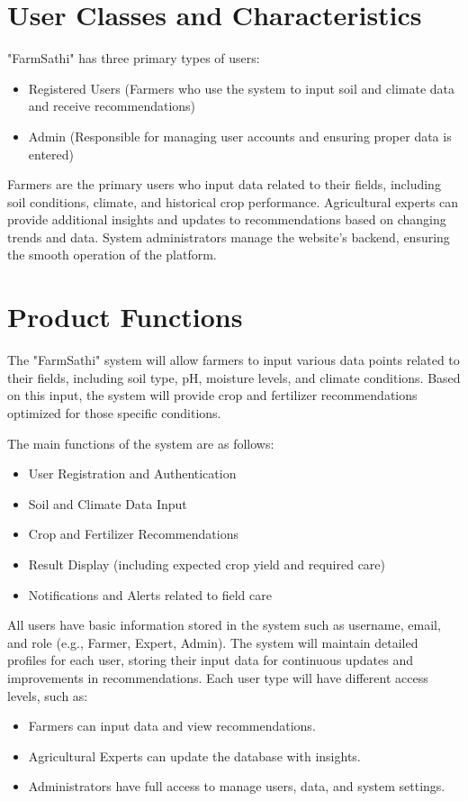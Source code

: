\documentclass{scrreprt}
\begin{document}
\section{User Classes and Characteristics}
"FarmSathi" has three primary types of users:
\begin{itemize}
    \item Registered Users (Farmers who use the system to input soil and climate data and receive recommendations)
    \item Admin (Responsible for managing user accounts and ensuring proper data is entered)
\end{itemize}
Farmers are the primary users who input data related to their fields, including soil conditions, climate, and historical crop performance. Agricultural experts can provide additional insights and updates to recommendations based on changing trends and data. System administrators manage the website's backend, ensuring the smooth operation of the platform.


\section{Product Functions}
The "FarmSathi" system will allow farmers to input various data points related to their fields, including soil type, pH, moisture levels, and climate conditions. Based on this input, the system will provide crop and fertilizer recommendations optimized for those specific conditions.
\newpage

The main functions of the system are as follows:
\begin{itemize}
    \item User Registration and Authentication
    \item Soil and Climate Data Input
    \item Crop and Fertilizer Recommendations
    \item Result Display (including expected crop yield and required care)
    \item Notifications and Alerts related to field care
\end{itemize}
\newline
All users have basic information stored in the system such as username, email, and role (e.g., Farmer, Expert, Admin). The system will maintain detailed profiles for each user, storing their input data for continuous updates and improvements in recommendations.
\newline
Each user type will have different access levels, such as:
\begin{itemize}
        \item Farmers can input data and view recommendations.
        \item Agricultural Experts can update the database with insights.
        \item Administrators have full access to manage users, data, and system settings.
    \end{itemize}
\end{document}

